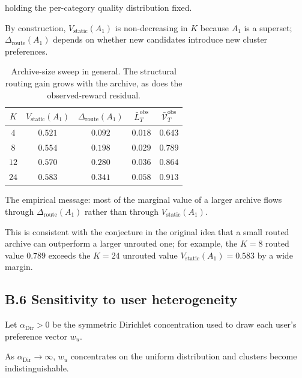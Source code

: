 \documentclass{article} %
\begin{document}
holding the per-category quality distribution fixed.

By construction, $V_{\mathrm{static}}(A_1)$ is non-decreasing in $K$ because $A_1$ is a superset; $\Delta_{\mathrm{route}}(A_1)$ depends on whether new candidates introduce new cluster preferences.

\begin{table}[h]
\centering
\small
\begin{tabular}{ccccc}
\toprule
$K$ & $V_{\mathrm{static}}(A_1)$ & $\Delta_{\mathrm{route}}(A_1)$ & $\bar L_T^{\mathrm{obs}}$ & $\bar{\mathcal V}_T^{\mathrm{obs}}$ \\
\midrule
$4$  & $0.521$ & $0.092$ & $0.018$ & $0.643$ \\
$8$  & $0.554$ & $0.198$ & $0.029$ & $0.789$ \\
$12$ & $0.570$ & $0.280$ & $0.036$ & $0.864$ \\
$24$ & $0.583$ & $0.341$ & $0.058$ & $0.913$ \\
\bottomrule
\end{tabular}
\caption{Archive-size sweep in general. The structural routing gain grows with
the archive, as does the observed-reward residual.}
\label{tab:app-K-sweep}
\end{table}

The empirical message: most of the marginal value of a larger archive flows through $\Delta_{\mathrm{route}}(A_1)$ rather than through $V_{\mathrm{static}}(A_1)$.

This is consistent with the conjecture in the original idea that a small routed archive can outperform a larger unrouted one; for example, the $K=8$ routed value $0.789$ exceeds the $K=24$ unrouted value $V_{\mathrm{static}}(A_1)=0.583$ by a wide margin.

\subsection{B.6 Sensitivity to user heterogeneity}

\label{app:dirichlet-sweep}

Let \(\alpha_{\mathrm{Dir}}>0\) be the symmetric Dirichlet concentration used
to draw each user's preference vector \(w_u\).

As \(\alpha_{\mathrm{Dir}}\to\infty\), \(w_u\) concentrates on the uniform
distribution and clusters become indistinguishable.
\end{document}
